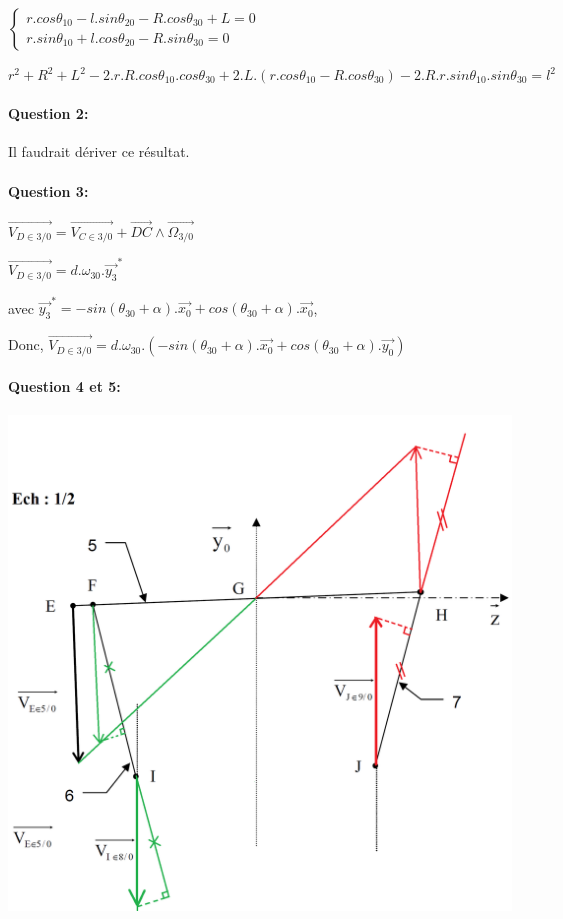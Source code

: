 $\left\{\begin{array}{l}
r.cos\theta_{10}-l.sin\theta_{20}-R.cos\theta_{30}+L=0 \\
r.sin\theta_{10}+l.cos\theta_{20}-R.sin\theta_{30}=0
\end{array}\right.$

$r^2+R^2+L^2-2.r.R.cos\theta_{10}.cos\theta_{30}+2.L.(r.cos\theta_{10}-R.cos\theta_{30})-2.R.r.sin\theta_{10}.sin\theta_{30}=l^2$

\paragraph{Question 2:} Il faudrait dériver ce résultat.

\paragraph{Question 3:} $\overrightarrow{V_{D\in 3/0}}=\overrightarrow{V_{C\in 3/0}}+\overrightarrow{DC}\wedge \overrightarrow{\Omega_{3/0}}$

$\overrightarrow{V_{D\in 3/0}}=d.\omega_{30}.\overrightarrow{y_3}^*$

avec $\overrightarrow{y_3}^*=-sin(\theta_{30}+\alpha).\overrightarrow{x_0}+cos(\theta_{30}+\alpha).\overrightarrow{x_0}$,

Donc, $\overrightarrow{V_{D\in 3/0}}=d.\omega_{30}.(-sin(\theta_{30}+\alpha).\overrightarrow{x_0}+cos(\theta_{30}+\alpha).\overrightarrow{y_0})$

\paragraph{Question 4 et 5:}

\begin{center}
 \includegraphics[width=0.8\linewidth]{img/chaudiere_cin_graph_cor}
\end{center}

